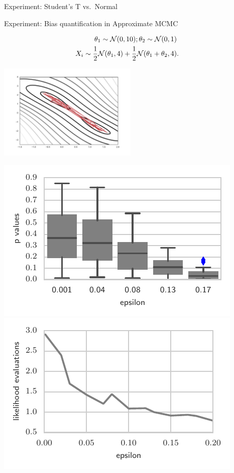 \begin{frame}
\begin{columns}
\begin{column}{.32\linewidth}
\begin{block}{Experiment: Student's T vs.\ Normal}
\begin{minipage}{.35\linewidth}
\end{minipage}
\end{block}
\vspace{-0.75cm}
\begin{block}{Experiment: Bias quantification in Approximate MCMC}
\begin{minipage}{.60\linewidth}
\begin{align*}
\theta_{1}\sim{\cal N}(0,10);\theta_{2}\sim{\cal N}(0,1)\\
X_{i}\sim\frac{1}{2}{\cal N}(\theta_{1},4)+\frac{1}{2}{\cal N}(\theta_{1}+\theta_{2},4) & .
\end{align*}
\begin{center}
\includegraphics[width=0.5\textwidth]{../../presentation/img/sgld_trace_and_density.pdf}
\end{center}
\end{minipage}
\begin{minipage}{.35\linewidth}
           \includegraphics[width=.6\textwidth]{../../presentation/img/Heiko1}\\
            \includegraphics[width=.6\textwidth]{../../presentation/img/Heiko2}

\end{minipage}
\end{block}
\end{column}
\end{columns}
\end{frame}
